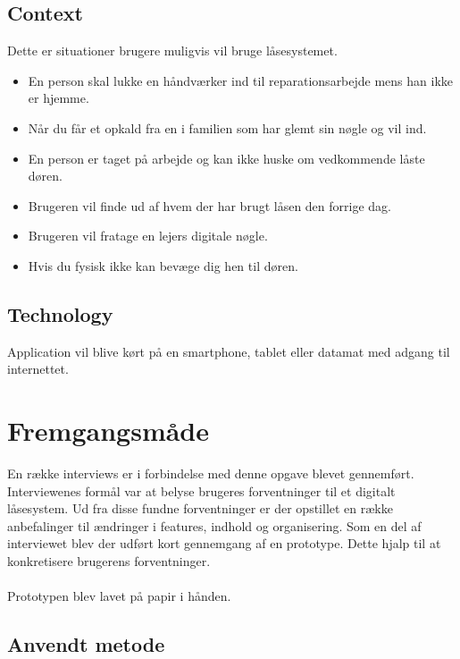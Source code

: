\documentclass[a4paper,12pt]{article}
\begin{document}
\subsection{Context}
Dette er situationer brugere muligvis vil bruge låsesystemet.

\begin{itemize}
    \item En person skal lukke en håndværker ind til reparationsarbejde mens han
ikke er hjemme.
    \item Når du får et opkald fra en i familien som har glemt sin nøgle og vil ind.
    \item En person er taget på arbejde og kan ikke huske om vedkommende låste døren.
    \item Brugeren vil finde ud af hvem der har brugt låsen den forrige dag.
    \item Brugeren vil fratage en lejers digitale nøgle.
    \item Hvis du fysisk ikke kan bevæge dig hen til døren.
\end{itemize}

\subsection{Technology}
Application vil blive kørt på en smartphone, tablet eller datamat med adgang til internettet.



\section{Fremgangsmåde}

En række interviews er i forbindelse med denne opgave blevet gennemført. Interviewenes formål
var at belyse brugeres forventninger til et digitalt låsesystem. Ud fra disse fundne
forventninger er der opstillet en række anbefalinger til ændringer i features, indhold og
organisering. Som en del af interviewet blev der udført kort gennemgang af en prototype. Dette
hjalp til at konkretisere brugerens forventninger.
\\ \\
Prototypen blev lavet på papir i hånden.

\subsection{Anvendt metode}
\end{document}
